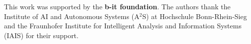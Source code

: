 \documentclass[../hbrs-poster.tex]{subfiles}
\begin{document}
    {
        This work was supported by the \textbf{b-it foundation}.
        The authors thank the Institute of AI and Autonomous Systems (A$^2$S) at Hochschule Bonn-Rhein-Sieg and the Fraunhofer Institute for Intelligent Analysis and Information Systems (IAIS) for their support.
    }
\end{document}
